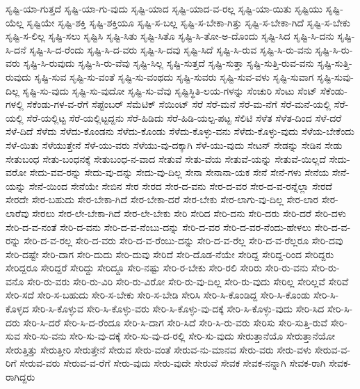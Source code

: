 {ಸೃಷ್ಟಿ-ಯಾ-ಗುತ್ತದೆ
ಸೃಷ್ಟಿ-ಯಾ-ಗು-ವುದು
ಸೃಷ್ಟಿ-ಯಾದ
ಸೃಷ್ಟಿ-ಯಾದ-ವ-ರಲ್ಲ
ಸೃಷ್ಟಿ-ಯಾ-ಯಿತು
ಸೃಷ್ಟಿಯು
ಸೃಷ್ಟಿ-ಯೆಲ್ಲ
ಸೃಷ್ಟಿಯೇ
ಸೃಷ್ಟಿ-ಶಕ್ತಿ
ಸೃಷ್ಟಿ-ಶಕ್ತಿಯೂ
ಸೃಷ್ಟಿ-ಸ-ಬಲ್ಲ
ಸೃಷ್ಟಿ-ಸ-ಬೇಕಾ-ಗಿತ್ತು
ಸೃಷ್ಟಿ-ಸ-ಬೇಕಾ-ಗಿದೆ
ಸೃಷ್ಟಿ-ಸ-ಬೇಕು
ಸೃಷ್ಟಿ-ಸ-ಲಿಲ್ಲ
ಸೃಷ್ಟಿ-ಸಲು
ಸೃಷ್ಟಿಸಿ
ಸೃಷ್ಟಿ-ಸಿತು
ಸೃಷ್ಟಿ-ಸಿತೊ
ಸೃಷ್ಟಿ-ಸಿ-ತೋ-ಅ-ದೊಂದು
ಸೃಷ್ಟಿ-ಸಿದ
ಸೃಷ್ಟಿ-ಸಿ-ದನು
ಸೃಷ್ಟಿ-ಸಿ-ದನೆ
ಸೃಷ್ಟಿ-ಸಿ-ದ-ರೆಂದು
ಸೃಷ್ಟಿ-ಸಿ-ದ-ವರು
ಸೃಷ್ಟಿ-ಸಿ-ದವು
ಸೃಷ್ಟಿ-ಸಿದೆ
ಸೃಷ್ಟಿ-ಸಿ-ರುವ
ಸೃಷ್ಟಿ-ಸಿ-ರು-ವನು
ಸೃಷ್ಟಿ-ಸಿ-ರು-ವರು
ಸೃಷ್ಟಿ-ಸಿ-ರುವುದು
ಸೃಷ್ಟಿ-ಸಿ-ರು-ವೆವು
ಸೃಷ್ಟಿ-ಸಿಲ್ಲ
ಸೃಷ್ಟಿ-ಸುತ್ತದೆ
ಸೃಷ್ಟಿ-ಸುತ್ತಾ
ಸೃಷ್ಟಿ-ಸುತ್ತಿ-ರುವ-ವನು
ಸೃಷ್ಟಿ-ಸುತ್ತಿ-ರುವುದು
ಸೃಷ್ಟಿ-ಸುವ
ಸೃಷ್ಟಿ-ಸು-ವಂತೆ
ಸೃಷ್ಟಿ-ಸು-ವಂಥದು
ಸೃಷ್ಟಿ-ಸುವರು
ಸೃಷ್ಟಿ-ಸುವ-ವಳು
ಸೃಷ್ಟಿ-ಸುವಾಗ
ಸೃಷ್ಟಿ-ಸುವು-ದಿಲ್ಲ
ಸೃಷ್ಟಿ-ಸು-ವುದು
ಸೃಷ್ಟಿ-ಸು-ವುದೋ
ಸೃಷ್ಟಿ-ಸು-ವೆವು
ಸೃಷ್ಟಿಸ್ಥಿತಿ-ಲಯ-ಗಳನ್ನು
ಸೆಂಚುರಿ
ಸೆಂಟು
ಸೆಂಟ್
ಸೆಕೆಂಡು-ಗಳಲ್ಲಿ
ಸೆಕೆಂಡು-ಗಳ-ವ-ರೆಗೆ
ಸೆಪ್ಟೆಂಬರ್
ಸೆಮೆಟಿಕ್
ಸೆಯಿಂಟ್
ಸೆರೆ
ಸೆರೆ-ಮನೆ
ಸೆರೆ-ಮ-ನೆಗೆ
ಸೆರೆ-ಮನೆ-ಯಲ್ಲಿ
ಸೆರೆ-ಯಲ್ಲಿ
ಸೆರೆ-ಯಲ್ಲಿಟ್ಟ
ಸೆರೆ-ಯಲ್ಲಿಟ್ಟದ್ದನು
ಸೆರೆ-ಹಿಡಿದು
ಸೆರೆ-ಹಿಡಿ-ಯಲ್ಪ-ಪಟ್ಟ
ಸೆಲಿಟಿ
ಸೆಳೆತ
ಸೆಳೆತ-ದಿಂದ
ಸೆಳೆ-ದರೆ
ಸೆಳೆ-ದಿದೆ
ಸೆಳೆದು
ಸೆಳೆದು-ಕೊಂಡನು
ಸೆಳೆದು-ಕೊಂಡು
ಸೆಳೆದು-ಕೊಳ್ಳು-ವನು
ಸೆಳೆದು-ಕೊಳ್ಳು-ವುದು
ಸೆಳೆಯ-ಬೇಕೆಂದು
ಸೆಳೆ-ಯಿತು
ಸೆಳೆಯುತ್ತೇನೆ
ಸೆಳೆ-ಯು-ವರು
ಸೆಳೆಯು-ವು-ದಕ್ಕಾಗಿ
ಸೆಳೆ-ಯು-ವುದು
ಸೇಟನ್
ಸೇಡನ್ನು
ಸೇಡಿನ
ಸೇಡು
ಸೇತುಬಂಧ
ಸೇತು-ಬಂಧನಕ್ಕೆ
ಸೇತುಬಂಧ-ನ-ವಾದ
ಸೇತುವೆ
ಸೇತು-ವೆಯ
ಸೇತುವೆ-ಯನ್ನು
ಸೇತುವೆ-ಯಿಲ್ಲದೆ
ಸೇದು-ವರೋ
ಸೇದು-ವವ-ರನ್ನು
ಸೇದು-ವು-ದನ್ನು
ಸೇದು-ವು-ದಿಲ್ಲ
ಸೇನಾ
ಸೇನಾನಾ-ಯಕ
ಸೇನೆ
ಸೇನೆ-ಗಳು
ಸೇನೆಯ
ಸೇನೆ-ಯನ್ನು
ಸೇನೆ-ಯಿಂದ
ಸೇನೆಯೇ
ಸೇಬಿನ
ಸೇರ
ಸೇರದ
ಸೇರ-ದ-ವನು
ಸೇರ-ದ-ವರ
ಸೇರ-ದ-ವ-ರನ್ನೆಲ್ಲಾ
ಸೇರದೆ
ಸೇರದೇ
ಸೇರ-ಬಹುದು
ಸೇರ-ಬೇಕಾ-ಗಿದೆ
ಸೇರ-ಬೇಕಾ-ದರೆ
ಸೇರ-ಬೇಕು
ಸೇರ-ಲಾಗು-ವು-ದಿಲ್ಲ
ಸೇರ-ಲಾರ
ಸೇರ-ಲಾರೆವು
ಸೇರಲು
ಸೇರ-ಲೇ-ಬೇಕಾ-ಗಿದೆ
ಸೇರ-ಲೇ-ಬೇಕು
ಸೇರಿ
ಸೇರಿದ
ಸೇರಿ-ದನು
ಸೇರಿ-ದರು
ಸೇರಿ-ದರೆ
ಸೇರಿ-ದಳು
ಸೇರಿ-ದ-ವ-ನಂತೆ
ಸೇರಿ-ದ-ವನು
ಸೇರಿ-ದ-ವ-ನೆಂಬು-ದನ್ನು
ಸೇರಿ-ದ-ವರ
ಸೇರಿ-ದ-ವರ-ನೆಂದು-ಹೇಳಲು
ಸೇರಿ-ದ-ವ-ರನ್ನು
ಸೇರಿ-ದ-ವ-ರಲ್ಲ
ಸೇರಿ-ದ-ವರು
ಸೇರಿ-ದ-ವ-ರೆಂಬು-ದನ್ನು
ಸೇರಿ-ದ-ವ-ರೆಲ್ಲ
ಸೇರಿ-ದ-ವ-ರೆಲ್ಲರೂ
ಸೇರಿ-ದವು
ಸೇರಿ-ದಷ್ಟೇ
ಸೇರಿ-ದಾಗ
ಸೇರಿ-ದುದು
ಸೇರಿ-ದುವು
ಸೇರಿದೆ
ಸೇರಿ-ದೊಡ-ನೆಯೇ
ಸೇರಿದ್ದ
ಸೇರಿದ್ದ-ರಿಂದ
ಸೇರಿದ್ದರು
ಸೇರಿದ್ದರೂ
ಸೇರಿದ್ದರೆ
ಸೇರಿದ್ದು
ಸೇರಿದ್ದೂ
ಸೇರಿ-ನಷ್ಟು
ಸೇರಿ-ರ-ಬೇಕು
ಸೇರಿ-ರಲಿ
ಸೇರಿರು
ಸೇರಿ-ರು-ವನು
ಸೇರಿ-ರು-ವನೊ
ಸೇರಿ-ರು-ವರು
ಸೇರಿ-ರು-ವಿರಿ
ಸೇರಿ-ರು-ವಿರೋ
ಸೇರಿ-ರು-ವು-ದಿಲ್ಲ
ಸೇರಿ-ರು-ವುದು
ಸೇರಿಲ್ಲ
ಸೇರಿಲ್ಲವೆ
ಸೇರಿವೆ
ಸೇರಿ-ಸದೆ
ಸೇರಿ-ಸ-ಬಹುದು
ಸೇರಿ-ಸ-ಬೇಕು
ಸೇರಿ-ಸ-ಬೇಡಿ
ಸೇರಿಸಿ
ಸೇರಿ-ಸಿ-ಕೊಂಡಿದ್ದ
ಸೇರಿ-ಸಿ-ಕೊಂಡು
ಸೇರಿ-ಸಿ-ಕೊಳ್ಳದ
ಸೇರಿ-ಸಿ-ಕೊಳ್ಳುವ
ಸೇರಿ-ಸಿ-ಕೊಳ್ಳು-ವರು
ಸೇರಿ-ಸಿ-ಕೊಳ್ಳು-ವು-ದಕ್ಕೆ
ಸೇರಿ-ಸಿ-ಕೊಳ್ಳು-ವುದು
ಸೇರಿ-ಸಿದ
ಸೇರಿ-ಸಿ-ದರು
ಸೇರಿ-ಸಿ-ದರೆ
ಸೇರಿ-ಸಿ-ದ-ರೆಂದೂ
ಸೇರಿ-ಸಿ-ದಾಗ
ಸೇರಿ-ಸಿದೆ
ಸೇರಿ-ಸಿ-ರು-ವರು
ಸೇರಿಸು
ಸೇರಿ-ಸುತ್ತಿ-ರುವೆ
ಸೇರಿ-ಸುವ
ಸೇರಿ-ಸು-ವನು
ಸೇರಿ-ಸು-ವು-ದಕ್ಕೆ
ಸೇರಿ-ಸು-ವು-ದ-ರಲ್ಲಿ
ಸೇರಿ-ಸು-ವುದು
ಸೇರುತ್ತಾನೆಯೊ
ಸೇರುತ್ತಾನೆಯೋ
ಸೇರುತ್ತಿತ್ತು
ಸೇರುತ್ತೀರಿ
ಸೇರುತ್ತೇನೆ
ಸೇರುವ
ಸೇರು-ವಂತೆ
ಸೇರುವ-ನು-ಮಾನವ
ಸೇರು-ವರು
ಸೇರು-ವಳು
ಸೇರುವ-ವ-ರಿಗೆ
ಸೇರುವ-ವರು
ಸೇರುವ-ವ-ರೆಗೆ
ಸೇರು-ವುದು
ಸೇರು-ವುದೇ
ಸೇರುವೆ
ಸೇವಕ
ಸೇವಕ-ನನ್ನಾಗಿ
ಸೇವಕ-ರಾಗಿ
ಸೇವಕ-ರಾಗಿದ್ದರು
}
